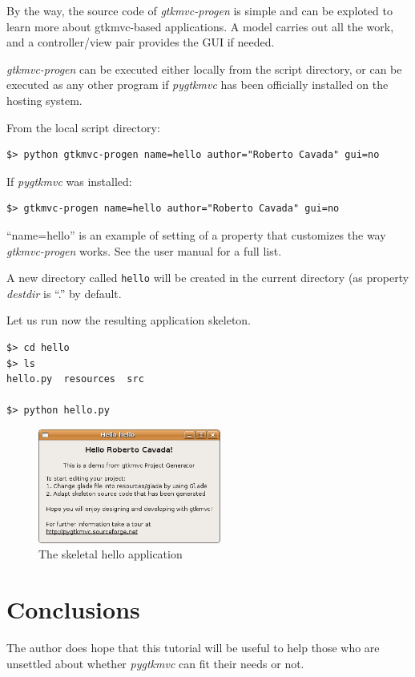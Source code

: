 \documentclass{article}
\newcommand{\kw}[1]{\emph{#1}\xspace}
\newcommand{\pygtkmvc}{\kw{pygtkmvc}}
\newcommand{\file}[1]{\texttt{#1}\xspace}
\begin{document}
By the way, the source code of \kw{gtkmvc-progen} is simple and can
be exploted to learn more about gtkmvc-based applications. A model
carries out all the work, and a controller/view pair provides the
GUI if needed.

\kw{gtkmvc-progen} can be executed either locally from the script
directory, or can be executed as any other program if \pygtkmvc has
been officially installed on the hosting system.

From the local script directory:
\begin{verbatim}
$> python gtkmvc-progen name=hello author="Roberto Cavada" gui=no
\end{verbatim}

If \pygtkmvc was installed:
\begin{verbatim}
$> gtkmvc-progen name=hello author="Roberto Cavada" gui=no
\end{verbatim}

``name=hello'' is an example of setting of a property that customizes the
way \kw{gtkmvc-progen} works. See the user manual for a full list. 

A new directory called \file{hello} will be created in the current
directory (as property \kw{destdir} is ``.'' by default. 

Let us run now the resulting application skeleton.

\begin{verbatim}
$> cd hello
$> ls
hello.py  resources  src

$> python hello.py
\end{verbatim}


\begin{figure}[htbp]
\begin{center}
\includegraphics[width=6cm]{eps/hello}
\caption{\label{fig:hello}The skeletal hello application}
\end{center}
\end{figure}


\section{Conclusions}
The author does hope that this tutorial will be useful to help those
who are unsettled about whether \pygtkmvc can fit their needs or not.
\end{document}

